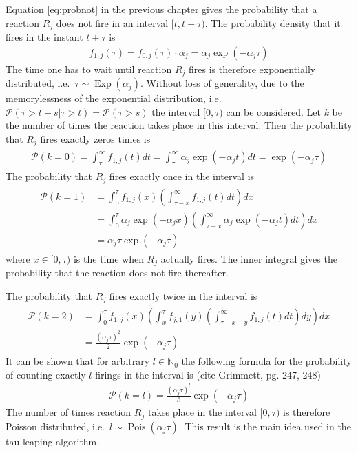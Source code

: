 Equation \eqref{eq:probnot} in the previous chapter gives the probability that a reaction $R_j$ does not fire in an interval $\lbrack t,t+\tau)$. The probability density that it fires in the instant $t+\tau$ is
\begin{align}
f_{1,j}(\tau) = f_{0,j}(\tau) \cdot \alpha_j = \alpha_j \exp(-\alpha_j \tau)
\end{align}
The time one has to wait until reaction $R_j$ fires is therefore exponentially distributed, i.e.\ $\tau \sim \operatorname{Exp}(\alpha_j)$. Without loss of generality, due to the memorylessness of the exponential distribution, i.e.\ $\mathcal{P}(\tau > t + s|\tau > t) = \mathcal{P}(\tau > s)$ the interval $\lbrack0,\tau)$ can be considered. Let $k$ be the number of times the reaction takes place in this interval. Then the probability that $R_j$ fires exactly zeros times is
\begin{align}
\begin{split}
\mathcal{P}(k=0) = \int_\tau^\infty f_{1,j}(t) dt =
\int_\tau^\infty \alpha_j \exp(-\alpha_j t) dt = \exp(-\alpha_j \tau)
\end{split}
\end{align}
The probability that $R_j$ fires exactly once in the interval is
\begin{align}
\begin{split}
\mathcal{P}(k=1) &= \int_0^\tau f_{1,j}(x) \left( \int_{\tau-x}^\infty f_{1,j}(t) dt \right) dx \\
&= \int_0^\tau \alpha_j \exp(-\alpha_j x) \left( \int_{\tau-x}^\infty \alpha_j \exp(-\alpha_j t) dt \right) dx \\
&= \alpha_j \tau \exp(-\alpha_j \tau)
\end{split}
\end{align}
where $x \in \lbrack 0,\tau)$ is the time when $R_j$ actually fires. The inner integral gives the probability that the reaction does not fire thereafter. 

The probability that $R_j$ fires exactly twice in the interval is 
\begin{align}
\begin{split}
\mathcal{P}(k=2) &= \int_0^\tau f_{1,j}(x) \left( \int_x^\tau f_{j,1}(y) \left( \int_{\tau-x-y}^\infty f_{1,j}(t)dt \right) dy \right) dx \\
&= \frac{(\alpha_j \tau)^2}{2} \exp(-\alpha_j \tau)
\end{split}
\end{align}
It can be shown that for arbitrary $l \in \mathbb{N}_0$ the following formula for the probability of counting exactly $l$ firings in the interval is (cite Grimmett, pg. 247, 248)
\begin{align}
\mathcal{P}(k=l) = \frac{(\alpha_j \tau)^l}{l!} \exp(-\alpha_j \tau)
\end{align}
The number of times reaction $R_j$ takes place in the interval $\lbrack 0,\tau)$ is therefore Poisson distributed, i.e.\ $l \sim \operatorname{Pois}(\alpha_j \tau)$. This result is the main idea used in the tau-leaping algorithm. 

